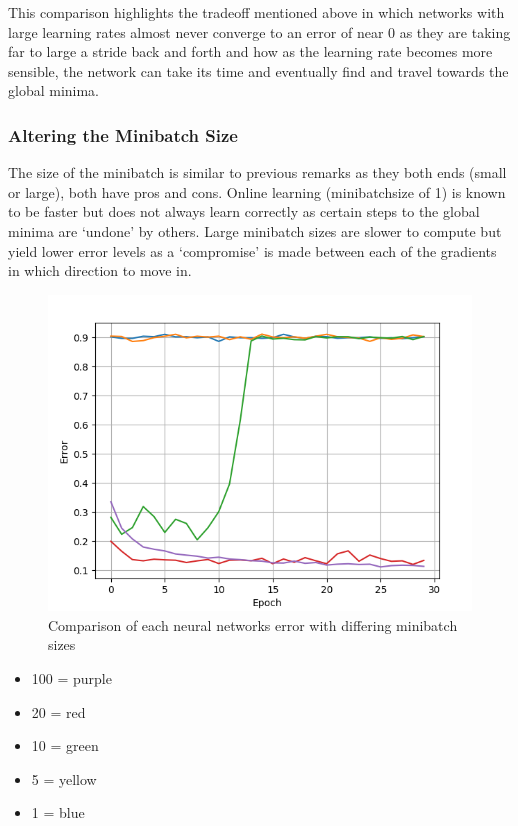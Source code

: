 \documentclass{article}
\begin{document}
This comparison highlights the tradeoff mentioned above in which networks with large learning rates almost never converge to an error of near 0 as they are taking far to large a stride back and forth and how as the learning rate becomes more sensible, the network can take its time and eventually find and travel towards the global minima.

\subsubsection{Altering the Minibatch Size}
The size of the minibatch is similar to previous remarks as they both ends (small or large), both have pros and cons. Online learning (minibatchsize of 1) is known to be faster but does not always learn correctly as certain steps to the global minima are `undone' by others. Large minibatch sizes are slower to compute but yield lower error levels as a `compromise' is made between each of the gradients in which direction to move in.

\begin{figure}[!htb]
\centering
	\includegraphics[scale=0.6]{all-mbs.png}
\caption{Comparison of each neural networks error with differing minibatch sizes}
\end{figure}

\begin{itemize}
\item 100 = purple
\item 20 = red
\item 10 = green
\item 5 = yellow
\item 1 = blue
\end{itemize}
\end{document}
